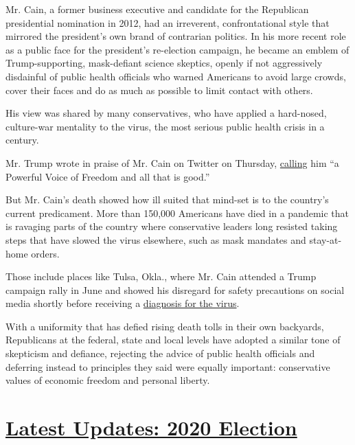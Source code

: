 Mr. Cain, a former business executive and candidate for the Republican
presidential nomination in 2012, had an irreverent, confrontational
style that mirrored the president's own brand of contrarian politics. In
his more recent role as a public face for the president's re-election
campaign, he became an emblem of Trump-supporting, mask-defiant science
skeptics, openly if not aggressively disdainful of public health
officials who warned Americans to avoid large crowds, cover their faces
and do as much as possible to limit contact with others.

His view was shared by many conservatives, who have applied a
hard-nosed, culture-war mentality to the virus, the most serious public
health crisis in a century.

Mr. Trump wrote in praise of Mr. Cain on Twitter on Thursday,
\href{https://twitter.com/realDonaldTrump/status/1288907916020461569?s=20}{calling}
him ``a Powerful Voice of Freedom and all that is good.''

But Mr. Cain's death showed how ill suited that mind-set is to the
country's current predicament. More than 150,000 Americans have died in
a pandemic that is ravaging parts of the country where conservative
leaders long resisted taking steps that have slowed the virus elsewhere,
such as mask mandates and stay-at-home orders.

Those include places like Tulsa, Okla., where Mr. Cain attended a Trump
campaign rally in June and showed his disregard for safety precautions
on social media shortly before receiving a
\href{https://www.nytimes.com/2020/07/02/us/politics/herman-cain-coronavirus.html}{diagnosis
for the virus}.

With a uniformity that has defied rising death tolls in their own
backyards, Republicans at the federal, state and local levels have
adopted a similar tone of skepticism and defiance, rejecting the advice
of public health officials and deferring instead to principles they said
were equally important: conservative values of economic freedom and
personal liberty.

\hypertarget{latest-updates-2020-election}{%
\section{\texorpdfstring{\href{https://www.nytimes.com/2020/07/31/us/elections/biden-vs-trump.html?action=click\&pgtype=Article\&state=default\&region=MAIN_CONTENT_1\&context=storylines_live_updates}{Latest
Updates: 2020
Election}}{Latest Updates: 2020 Election}}\label{latest-updates-2020-election}}

